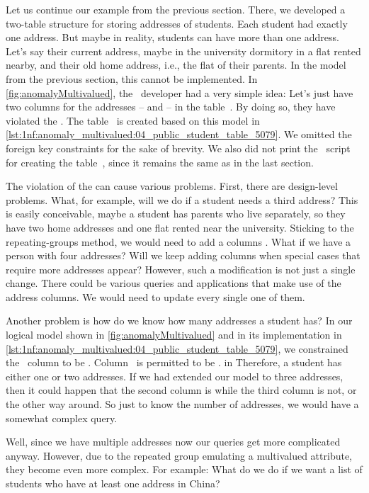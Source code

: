 \afterpage{\clearpage}%
%
Let us continue our example from the previous section.
There, we developed a two-table structure for storing addresses of students.
Each student had exactly one address.
But maybe in reality, students can have more than one address.
Let's say their current address, maybe in the university dormitory in a flat rented nearby, and their old home address, i.e., the flat of their parents.
In the model from the previous section, this cannot be implemented.
In \cref{fig:anomalyMultivalued}, the \db\ developer had a very simple idea:
Let's just have two columns for the addresses --  and  -- in the table~.
By doing so, they have violated the .
The table~ is created based on this model in \cref{lst:1nf:anomaly_multivalued:04_public_student_table_5079}.
We omitted the foreign key  constraints for the sake of brevity.
We also did not print the \sql\ script for creating the table~, since it remains the same as in the last section.

The violation of the  can cause various problems.
First, there are design-level problems.
What, for example, will we do if a student needs a third address?
This is easily conceivable, maybe a student has parents who live separately, so they have two home addresses and one flat rented near the university.
Sticking to the repeating-groups method, we would need to add a columns .
What if we have a person with four addresses?
Will we keep adding columns when special cases that require more addresses appear?
However, such a modification is not just a single change.
There could be various queries and applications that make use of the address columns.
We would need to update every single one of them.

Another problem is how do we know how many addresses a student has?
In our logical model shown in \cref{fig:anomalyMultivalued} and in its implementation in \cref{lst:1nf:anomaly_multivalued:04_public_student_table_5079}, we constrained the ~column to be .
Column~ is permitted to be . in
Therefore, a student has either one or two addresses.
If we had extended our model to three addresses, then it could happen that the second column is  while the third column is not, or the other way around.
So just to know the number of addresses, we would have a somewhat complex query.

Well, since we have multiple addresses now our queries get more complicated anyway.
However, due to the repeated group emulating a multivalued attribute, they become even more complex.
For example:
What do we do if we want a list of students who have at least one address in China?

